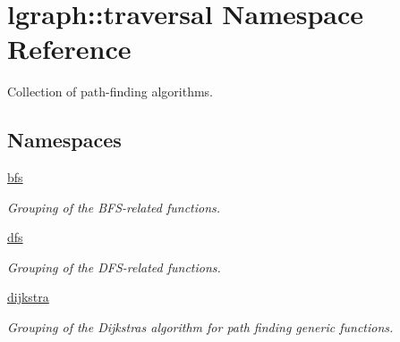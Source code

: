 \hypertarget{namespacelgraph_1_1traversal}{}\section{lgraph\+:\+:traversal Namespace Reference}
\label{namespacelgraph_1_1traversal}


Collection of path-\/finding algorithms.  


\subsection*{Namespaces}
\begin{DoxyCompactItemize}
\item 
 \hyperlink{namespacelgraph_1_1traversal_1_1bfs}{bfs}
\begin{DoxyCompactList}\small\item\em Grouping of the B\+F\+S-\/related functions. \end{DoxyCompactList}\item 
 \hyperlink{namespacelgraph_1_1traversal_1_1dfs}{dfs}
\begin{DoxyCompactList}\small\item\em Grouping of the D\+F\+S-\/related functions. \end{DoxyCompactList}\item 
 \hyperlink{namespacelgraph_1_1traversal_1_1dijkstra}{dijkstra}
\begin{DoxyCompactList}\small\item\em Grouping of the Dijkstra\textquotesingle{}s algorithm for path finding generic functions. \end{DoxyCompactList}\end{DoxyCompactItemize}
